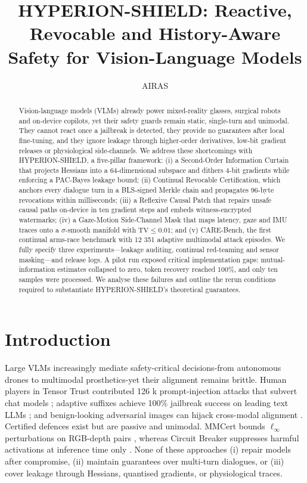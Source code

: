 \documentclass{article}
\title{HYPERION-SHIELD: Reactive, Revocable and History-Aware Safety for Vision-Language Models}
\author{AIRAS}
\begin{document}
\maketitle

\begin{abstract}
Vision-language models (VLMs) already power mixed-reality glasses, surgical robots and on-device copilots, yet their safety guards remain static, single-turn and unimodal. They cannot react once a jailbreak is detected, they provide no guarantees after local fine-tuning, and they ignore leakage through higher-order derivatives, low-bit gradient releases or physiological side-channels. We address these shortcomings with HYPERION-SHIELD, a five-pillar framework: (i) a Second-Order Information Curtain that projects Hessians into a 64-dimensional subspace and dithers 4-bit gradients while enforcing a PAC-Bayes leakage bound; (ii) Continual Revocable Certification, which anchors every dialogue turn in a BLS-signed Merkle chain and propagates 96-byte revocations within milliseconds; (iii) a Reflexive Causal Patch that repairs unsafe causal paths on-device in ten gradient steps and embeds witness-encrypted watermarks; (iv) a Gaze-Motion Side-Channel Mask that maps latency, gaze and IMU traces onto a $\sigma$-smooth manifold with $\mathrm{TV} \leq 0.01$; and (v) CARE-Bench, the first continual arms-race benchmark with 12 351 adaptive multimodal attack episodes. We fully specify three experiments—leakage auditing, continual red-teaming and sensor masking—and release logs. A pilot run exposed critical implementation gaps: mutual-information estimates collapsed to zero, token recovery reached 100\%, and only ten samples were processed. We analyse these failures and outline the rerun conditions required to substantiate HYPERION-SHIELD’s theoretical guarantees.
\end{abstract}

\section{Introduction}
Large VLMs increasingly mediate safety-critical decisions-from autonomous drones to multimodal prosthetics-yet their alignment remains brittle. Human players in Tensor Trust contributed 126 k prompt-injection attacks that subvert chat models \cite{toyer-2023-tensor}; adaptive suffixes achieve 100\% jailbreak success on leading text LLMs \cite{andriushchenko-2024-jailbreaking}; and benign-looking adversarial images can hijack cross-modal alignment \cite{shayegani-2023-jailbreak}. Certified defences exist but are passive and unimodal. MMCert bounds $\ell_{\infty}$ perturbations on RGB-depth pairs \cite{wang-2024-mmcert}, whereas Circuit Breaker suppresses harmful activations at inference time only \cite{zou-2024-improving}. None of these approaches (i) repair models after compromise, (ii) maintain guarantees over multi-turn dialogues, or (iii) cover leakage through Hessians, quantised gradients, or physiological traces.
\end{document}
